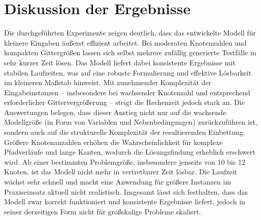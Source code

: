 \documentclass[bachelor, german]{algothesis}
\begin{document}
\section{Diskussion der Ergebnisse}
Die durchgeführten Experimente zeigen deutlich, dass das entwickelte Modell für kleinere Eingaben äußerst effizient arbeitet. Bei moderaten Knotenzahlen und kompakten Gittergrößen lassen sich selbst mehrere zufällig generierte Testfälle in sehr kurzer Zeit lösen. Das Modell liefert dabei konsistente Ergebnisse mit stabilen Laufzeiten, was auf eine robuste Formulierung und effektive Lösbarkeit im kleineren Maßstab hinweist.\newline 
Mit zunehmender Komplexität der Eingabeinstanzen – insbesondere bei wachsender Knotenzahl und entsprechend erforderlicher Gittervergrößerung – steigt die Rechenzeit jedoch stark an. Die Auswertungen belegen, dass dieser Anstieg nicht nur auf die wachsende Modellgröße (in Form von Variablen und Nebenbedingungen) zurückzuführen ist, sondern auch auf die strukturelle Komplexität der resultierenden Einbettung. Größere Knotenanzahlen erhöhen die Wahrscheinlichkeit für komplexe Pfadverläufe und lange Kanten, wodurch die Lösungsfindung erheblich erschwert wird.\newline 
Ab einer bestimmten Problemgröße, insbesondere jenseits von 10 bis 12 Knoten, ist das Modell nicht mehr in vertretbarer Zeit lösbar. Die Laufzeit wächst sehr schnell und macht eine Anwendung für größere Instanzen im Praxiseinsatz aktuell nicht realistisch. Insgesamt lässt sich festhalten, dass das Modell zwar korrekt funktioniert und konsistente Ergebnisse liefert, jedoch in seiner derzeitigen Form nicht für großskalige Probleme skaliert.
\end{document}
